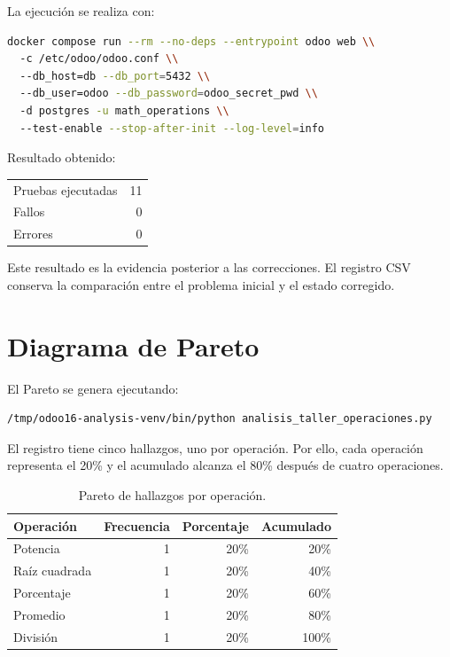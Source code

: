 \documentclass{article}
\begin{document}
La ejecución se realiza con:
\begin{lstlisting}[language=bash]
docker compose run --rm --no-deps --entrypoint odoo web \\
  -c /etc/odoo/odoo.conf \\
  --db_host=db --db_port=5432 \\
  --db_user=odoo --db_password=odoo_secret_pwd \\
  -d postgres -u math_operations \\
  --test-enable --stop-after-init --log-level=info
\end{lstlisting}

Resultado obtenido:
\begin{center}
\begin{tabular}{lr}
\toprule
Pruebas ejecutadas & 11 \\
Fallos & 0 \\
Errores & 0 \\
\bottomrule
\end{tabular}
\end{center}

Este resultado es la evidencia posterior a las correcciones. El registro CSV conserva la comparación entre el problema inicial y el estado corregido.

\section{Diagrama de Pareto}
El Pareto se genera ejecutando:
\begin{lstlisting}[language=bash]
/tmp/odoo16-analysis-venv/bin/python analisis_taller_operaciones.py
\end{lstlisting}

El registro tiene cinco hallazgos, uno por operación. Por ello, cada operación representa el 20\% y el acumulado alcanza el 80\% después de cuatro operaciones.

\begin{table}[H]
\centering
\begin{tabular}{lrrr}
\toprule
Operación & Frecuencia & Porcentaje & Acumulado \\
\midrule
Potencia & 1 & 20\% & 20\% \\
Raíz cuadrada & 1 & 20\% & 40\% \\
Porcentaje & 1 & 20\% & 60\% \\
Promedio & 1 & 20\% & 80\% \\
División & 1 & 20\% & 100\% \\
\bottomrule
\end{tabular}
\caption{Pareto de hallazgos por operación.}
\end{table}
\end{document}
